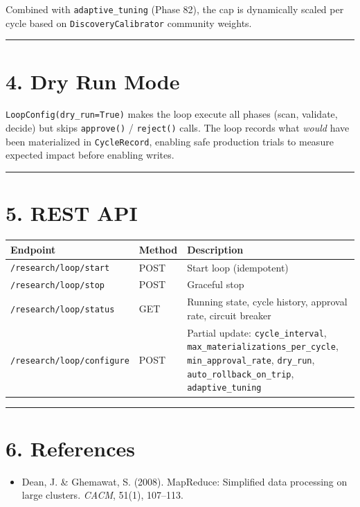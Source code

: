 Combined with \texttt{adaptive\_tuning} (Phase 82), the cap is dynamically scaled per cycle based on \texttt{DiscoveryCalibrator} community weights.

\medskip\noindent\rule{\linewidth}{0.4pt}\medskip

\section*{4. Dry Run Mode}

\texttt{LoopConfig(dry\_run=True)} makes the loop execute all phases (scan, validate, decide) but skips \texttt{approve()} / \texttt{reject()} calls. The loop records what \textit{would} have been materialized in \texttt{CycleRecord}, enabling safe production trials to measure expected impact before enabling writes.

\medskip\noindent\rule{\linewidth}{0.4pt}\medskip

\section*{5. REST API}

\begin{table}[h]
\small\centering
\begin{tabular}{lll}
\toprule
Endpoint & Method & Description \\
\midrule
\texttt{/research/loop/start} & POST & Start loop (idempotent) \\
\texttt{/research/loop/stop} & POST & Graceful stop \\
\texttt{/research/loop/status} & GET & Running state, cycle history, approval rate, circuit breaker \\
\texttt{/research/loop/configure} & POST & Partial update: \texttt{cycle\_interval}, \texttt{max\_materializations\_per\_cycle}, \texttt{min\_approval\_rate}, \texttt{dry\_run}, \texttt{auto\_rollback\_on\_trip}, \texttt{adaptive\_tuning} \\
\bottomrule
\end{tabular}
\end{table}


\medskip\noindent\rule{\linewidth}{0.4pt}\medskip

\section*{6. References}

\begin{itemize}
  \item [dean2008mapreduce] Dean, J. \& Ghemawat, S. (2008). MapReduce: Simplified data processing on large clusters. \textit{CACM}, 51(1), 107--113.
\end{itemize}

